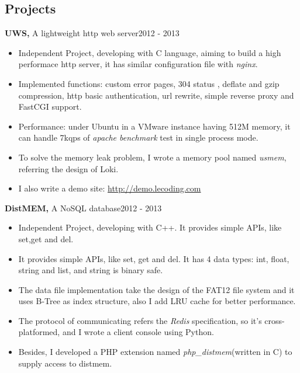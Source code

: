 \documentclass[margin]{res}
\begin{document}
\begin{resume}
\section{Projects}
{\bf UWS,} A lightweight http web server\hfill 2012 - 2013
\begin{itemize} \itemsep -2pt
  \item Independent Project, developing with C language, aiming to build a high performace http server, it has similar configuration file with {\it nginx}.
  \item Implemented functions: custom error pages, 304 status , deflate and gzip compression, http basic authentication, url rewrite, simple reverse proxy and FastCGI support.
  \item Performance: under Ubuntu in a VMware instance having 512M memory, it can handle 7kqps of {\it apache benchmark} test in single process mode.
  \item To solve the memory leak problem, I wrote a memory pool named {\it usmem}, referring the design of Loki.
  \item I also write a demo site: \href{http://demo.lecoding.com}{http://demo.lecoding.com}
\end{itemize}



{\bf DistMEM,} A NoSQL database\hfill  2012 - 2013
\begin{itemize} \itemsep -2pt
  \item Independent Project, developing with C++. It provides simple APIs, like set,get and del.
  \item It provides simple APIs, like set, get and del. It has 4 data types: int, float, string and list, and string is binary safe.
  \item The data file implementation take the design of the FAT12 file system and it uses B-Tree as index structure, also I add LRU cache for better performance. 
  \item The protocol of communicating refers the {\it Redis} specification, so it's cross-platformed, and I wrote a client console using Python.
  \item Besides, I developed a PHP extension named {\it php\_distmem}(written in C) to supply access to distmem.
\end{itemize}


\end{resume}
\end{document}
